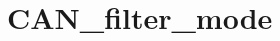 \hypertarget{group___c_a_n__filter__mode}{\section{C\-A\-N\-\_\-filter\-\_\-mode}
\label{group___c_a_n__filter__mode}
}
